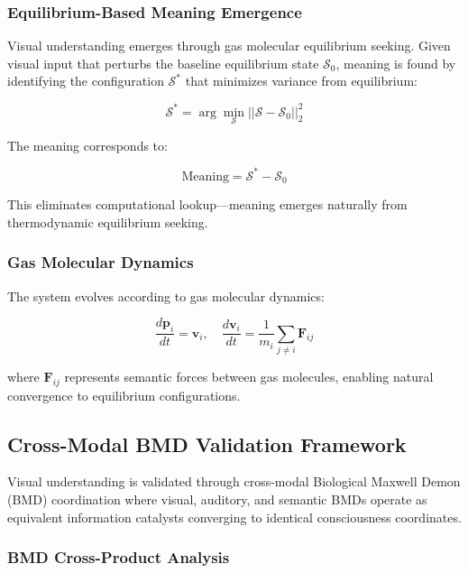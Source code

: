 \documentclass[12pt,a4paper]{article}
\begin{document}
\subsubsection{Equilibrium-Based Meaning Emergence}

Visual understanding emerges through gas molecular equilibrium seeking. Given visual input that perturbs the baseline equilibrium state $\mathcal{S}_0$, meaning is found by identifying the configuration $\mathcal{S}^*$ that minimizes variance from equilibrium:

\begin{equation}
\mathcal{S}^* = \arg\min_{\mathcal{S}} ||\mathcal{S} - \mathcal{S}_0||_2^2
\end{equation}

The meaning corresponds to:

\begin{equation}
\text{Meaning} = \mathcal{S}^* - \mathcal{S}_0
\end{equation}

This eliminates computational lookup—meaning emerges naturally from thermodynamic equilibrium seeking.

\subsubsection{Gas Molecular Dynamics}

The system evolves according to gas molecular dynamics:

\begin{equation}
\frac{d\mathbf{p}_i}{dt} = \mathbf{v}_i, \quad \frac{d\mathbf{v}_i}{dt} = \frac{1}{m_i}\sum_{j \neq i} \mathbf{F}_{ij}
\end{equation}

where $\mathbf{F}_{ij}$ represents semantic forces between gas molecules, enabling natural convergence to equilibrium configurations.

\subsection{Cross-Modal BMD Validation Framework}

Visual understanding is validated through cross-modal Biological Maxwell Demon (BMD) coordination where visual, auditory, and semantic BMDs operate as equivalent information catalysts converging to identical consciousness coordinates.

\subsubsection{BMD Cross-Product Analysis}
\end{document}

